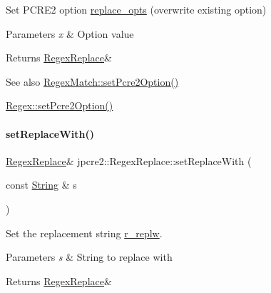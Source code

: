 Set P\+C\+R\+E2 option \hyperlink{classjpcre2_1_1RegexReplace_afc79699cfcad8b7cbb26864b6b67cdc7}{replace\+\_\+opts} (overwrite existing option) 


\begin{DoxyParams}{Parameters}
{\em x} & Option value \\
\hline
\end{DoxyParams}
\begin{DoxyReturn}{Returns}
\hyperlink{classjpcre2_1_1RegexReplace}{Regex\+Replace}\& 
\end{DoxyReturn}
\begin{DoxySeeAlso}{See also}
\hyperlink{classjpcre2_1_1RegexMatch_ae4ab558c2bec0bc9639dbca70ab47496_ae4ab558c2bec0bc9639dbca70ab47496}{Regex\+Match\+::set\+Pcre2\+Option()} 

\hyperlink{classjpcre2_1_1Regex_acdc6f97f4030ae109c4e1a4e2310bceb_acdc6f97f4030ae109c4e1a4e2310bceb}{Regex\+::set\+Pcre2\+Option()} 
\end{DoxySeeAlso}
\hypertarget{classjpcre2_1_1RegexReplace_af1069f489de9b343493da2dc77b04c73_af1069f489de9b343493da2dc77b04c73}{}\label{classjpcre2_1_1RegexReplace_af1069f489de9b343493da2dc77b04c73_af1069f489de9b343493da2dc77b04c73} 
\paragraph{\texorpdfstring{set\+Replace\+With()}{setReplaceWith()}}
{\footnotesize\ttfamily \hyperlink{classjpcre2_1_1RegexReplace}{Regex\+Replace}\& jpcre2\+::\+Regex\+Replace\+::set\+Replace\+With (\begin{DoxyParamCaption}\item[{const \hyperlink{namespacejpcre2_a91f03070152fb228bc116c5a737f1d16}{String} \&}]{s }\end{DoxyParamCaption})\hspace{0.3cm}{\ttfamily [inline]}}



Set the replacement string \hyperlink{classjpcre2_1_1RegexReplace_a73d0da1aac8b83a0a47b24629b5013f4}{r\+\_\+replw}. 


\begin{DoxyParams}{Parameters}
{\em s} & String to replace with \\
\hline
\end{DoxyParams}
\begin{DoxyReturn}{Returns}
\hyperlink{classjpcre2_1_1RegexReplace}{Regex\+Replace}\& 
\end{DoxyReturn}
\hypertarget{classjpcre2_1_1RegexReplace_a46eefdb105827920bebc8436721fa4cb_a46eefdb105827920bebc8436721fa4cb}{}\label{classjpcre2_1_1RegexReplace_a46eefdb105827920bebc8436721fa4cb_a46eefdb105827920bebc8436721fa4cb} 
